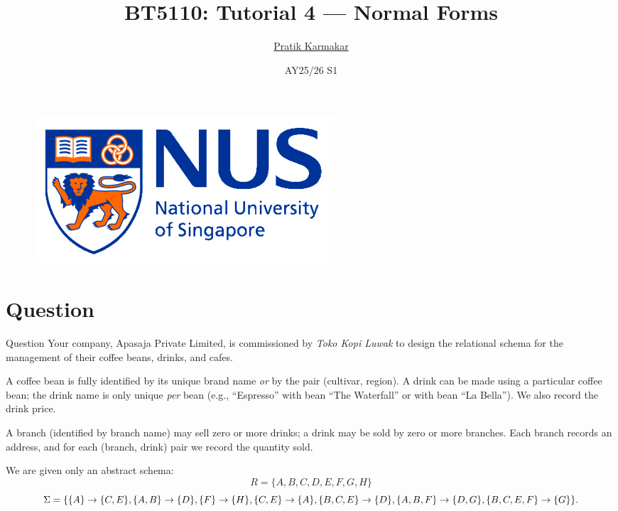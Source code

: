 \documentclass[UTF8]{beamer}
\author{\href{https://pratik2358.github.io/}{Pratik Karmakar}}
\title{BT5110: Tutorial 4 — Normal Forms}
\institute{
  School of Computing,\\
  National University of Singapore
}
\date{AY25/26 S1}
\begin{document}
\begin{frame}
  \titlepage
  \begin{figure}[htpb]
    \begin{center}
      \includegraphics[keepaspectratio, scale=0.18]{nus-logo.png}
    \end{center}
  \end{figure}
\end{frame}

\section{Question}
\begin{frame}{Question}
\footnotesize
Your company, Apasaja Private Limited, is commissioned by \emph{Toko Kopi Luwak} to design the relational schema for the management of their coffee beans, drinks, and cafes.\medskip

A coffee bean is fully identified by its unique brand name \emph{or} by the pair (cultivar, region). A drink can be made using a particular coffee bean; the drink name is only unique \emph{per} bean (e.g., ``Espresso'' with bean ``The Waterfall'' or with bean ``La Bella''). We also record the drink price.\medskip

A branch (identified by branch name) may sell zero or more drinks; a drink may be sold by zero or more branches. Each branch records an address, and for each (branch, drink) pair we record the quantity sold.
\medskip

We are given only an abstract schema:
\[
R=\{A,B,C,D,E,F,G,H\}
\]
\[
\Sigma=\{\{A\} \to \{C,E\}, \{A,B\} \to \{D\}, \{F\} \to \{H\}, \{C,E\} \to \{A\},\\
\{B,C,E\} \to \{D\}, \{A,B,F\} \to \{D,G\}, \{B,C,E,F\} \to \{G\}\}.
\]
\end{frame}
\end{document}
